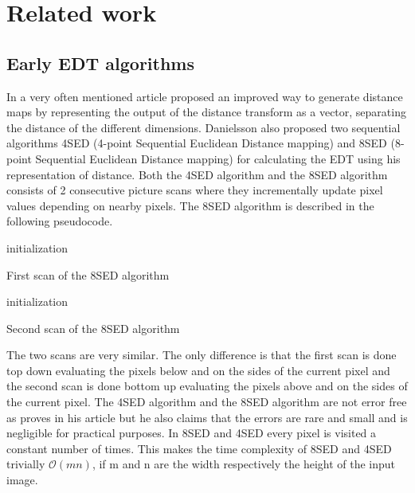 \chapter{Related work}\label{cha:relatedwork}
\section{Early EDT algorithms}\label{earlyedt}
In a very often mentioned article \citet{Danielsson} proposed an improved way to generate distance maps by representing the output of the distance transform as a vector, separating the distance of the different dimensions. Danielsson also proposed two sequential algorithms 4SED (4-point Sequential Euclidean Distance mapping) and 8SED (8-point Sequential Euclidean Distance mapping) for calculating the EDT using his representation of distance. Both the 4SED algorithm and the 8SED algorithm consists of 2 consecutive picture scans where they incrementally update pixel values depending on nearby pixels. The 8SED algorithm is described in the following pseudocode.\newpage

\begin{algorithm}[H]
initialization\;
\caption{First scan of the 8SED algorithm}
\end{algorithm}
\begin{algorithm}[H]
initialization\;
\caption{Second scan of the 8SED algorithm}
\end{algorithm}

The two scans are very similar. The only difference is that the first scan is done top down evaluating the pixels below and on the sides of the current pixel and the second scan is done bottom up evaluating the pixels above and on the sides of the current pixel\citep{Ragnemalm:1993}. The 4SED algorithm and the 8SED algorithm are not error free as \citet{Danielsson} proves in his article but he also claims that the errors are rare and small and is negligible for practical purposes. In 8SED and 4SED every pixel is visited a constant number of times. This makes the time complexity of 8SED and 4SED trivially $\mathcal{O}(mn)$, if m and n are the width respectively the height of the input image.

